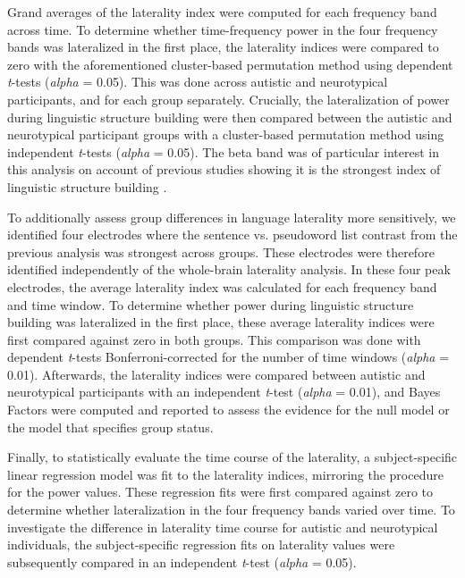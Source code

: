 Grand averages of the laterality index were computed for each frequency band across time. To determine whether time-frequency power in the four frequency bands was lateralized in the first place, the laterality indices were compared to zero with the aforementioned cluster-based permutation method using dependent \textit{t}-tests (\textit{alpha} = 0.05). This was done across autistic and neurotypical participants, and for each group separately. Crucially, the lateralization of power during linguistic structure building were then compared between the autistic and neurotypical participant groups with a cluster-based permutation method using independent \textit{t}-tests (\textit{alpha} = 0.05). The beta band was of particular interest in this analysis on account of previous studies showing it is the strongest index of linguistic structure building \citep{bastiaansen2010,bastiaansen2015}. 

To additionally assess group differences in language laterality more sensitively, we identified four electrodes where the sentence vs. pseudoword list contrast from the previous analysis was strongest across groups. These electrodes were therefore identified independently of the whole-brain laterality analysis. In these four peak electrodes, the average laterality index was calculated for each frequency band and time window. To determine whether power during linguistic structure building was lateralized in the first place, these average laterality indices were first compared against zero in both groups. This comparison was done with dependent \textit{t}-tests Bonferroni-corrected for the number of time windows (\textit{alpha} = 0.01). Afterwards, the laterality indices were compared between autistic and neurotypical participants with an independent \textit{t}-test (\textit{alpha} = 0.01), and Bayes Factors were computed and reported to assess the evidence for the null model or the model that specifies group status.

Finally, to statistically evaluate the time course of the laterality, a subject-specific linear regression model was fit to the laterality indices, mirroring the procedure for the power values. These regression fits were first compared against zero to determine whether lateralization in the four frequency bands varied over time. To investigate the difference in laterality time course for autistic and neurotypical individuals, the subject-specific regression fits on laterality values were subsequently compared in an independent \textit{t}-test (\textit{alpha} = 0.05). 

